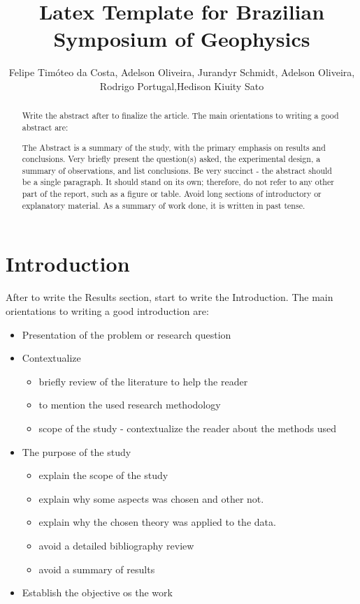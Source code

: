 \documentclass[twoside,letterpaper,twocolumn]{article}
\title{Latex Template for Brazilian Symposium of Geophysics}
\author{Felipe Timóteo da Costa, Adelson Oliveira, Jurandyr Schmidt, Adelson Oliveira, Rodrigo Portugal,Hedison Kiuity Sato}
\begin{document}
\maketitle

\begin{abstract}

Write the abstract after to finalize the article. The main orientations to writing a good abstract are:

The Abstract is a summary of the study, with the primary emphasis on results and conclusions. Very briefly present the question(s) asked, the experimental design, a summary of observations, and list conclusions. Be very succinct - the abstract should be a single paragraph. It should stand on its own; therefore, do not refer to any other part of the report, such as a figure or table. Avoid long sections of introductory or explanatory material. As a summary of work done, it is written in past tense.

\end{abstract}

\section{Introduction}

After to write the Results section, start to write the Introduction. The main orientations to writing a good introduction are:

\begin{itemize}
	\item Presentation of the problem or research question
	\item Contextualize
	\begin{itemize}
		\item briefly review of the literature to help the reader
		\item to mention the used research methodology 
		\item scope of the study - contextualize the reader about the methods used
	\end{itemize}
	\item The purpose of the study
	\begin{itemize}
		\item explain the scope of the study
		\item explain why some aspects was chosen and other not.
		\item explain why the chosen theory was applied to the data.
		\item avoid a detailed bibliography review
		\item avoid a summary of results 
	\end{itemize}
	\item Establish the objective os the work
\end{itemize}
\end{document}
